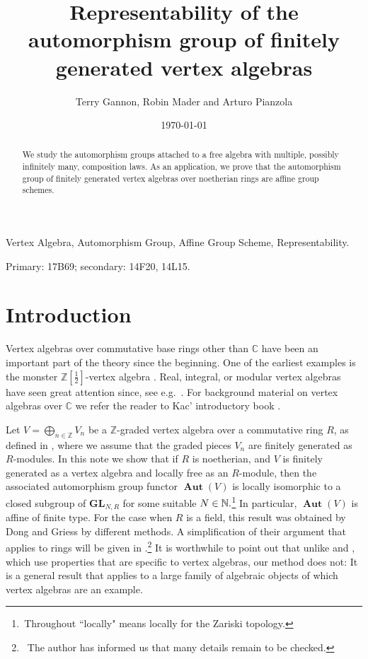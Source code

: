 \documentclass{article}
\author{Terry Gannon, Robin Mader and Arturo Pianzola}
\date{\today}
\title{Representability of the  automorphism group of finitely generated vertex algebras}
\theoremstyle{definition}
\def\BAut{\ensuremath{\operatorname{\mathbf{Aut}}}}
\def\BGL{\ensuremath{\mathbf{G}\mathbf{L}}}
\begin{document}
\maketitle

\begin{abstract} We study the automorphism groups attached to a free algebra with multiple, possibly infinitely many, composition laws. As an application, we prove that the automorphism group of finitely generated vertex algebras over noetherian rings are affine group schemes.
\end{abstract}
\medskip

 Vertex Algebra, Automorphism Group, Affine Group Scheme, Representability.

 Primary: 17B69; secondary: 14F20, 14L15.
\bigskip


\section{Introduction}Vertex algebras over commutative base rings other than $\mathbb C$ have been an important part of the theory since the beginning. One of the earliest examples is the monster $\mathbb Z[\frac{1}{2}]$-vertex algebra \cite{BR}. Real, integral, or modular vertex algebras have seen great attention since, see e.g.\ \cite{DongRen, Griess, McRae, Mason, Car, Car2, LiMuJiao}. 
For background material on vertex algebras over $\mathbb C$ we refer the reader to Kac' introductory book \cite{Kac}.

Let $V = \bigoplus_{n \in \mathbb Z} V_n$ be a $\mathbb Z$-graded vertex algebra over a commutative ring $R$, as defined in \cite[Def.\ 2.1]{Griess}, where we assume that the graded pieces $V_n$ are finitely generated as $R$-modules. In this note we show that if $R$ is noetherian, and  $V$ is finitely generated as a vertex algebra and locally free as an $R$-module, then the associated automorphism group functor $\BAut(V)$ is locally isomorphic to a closed subgroup of $\BGL_{N,R}$ for some suitable $N \in \Bbb{N}.$\footnote{\,Throughout ``locally" means locally for the Zariski topology.} In particular, $\BAut(V)$ is affine of finite type. 
 For the case when $R$ is a field, this result was obtained by Dong and Griess \cite{DongGr} by different methods. A simplification of their argument that applies to rings will be given in \cite{Car2}.\footnote{\, The author has informed us that many details remain to be checked.} It is worthwhile to point out that unlike \cite{DongGr} and \cite{Car2}, which use properties that are specific to vertex algebras, our method does not: It is a general result that applies to a large family of algebraic objects of which vertex algebras are an example.
\end{document}
